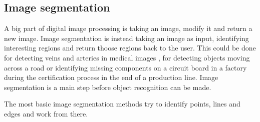 \subsection{Image segmentation}
A big part of digital image processing is taking an image, modify it and
return a new image. Image segmentation is instead taking an image as input,
identifying interesting regions and return thoose regions back to the user.
This could be done for detecting veins and arteries in medical images \cite{olena2010},
for detecting objects moving across a road or identifying missing components on
a circuit board in a factory during the certification process in the end of a production line.
Image segmentation is a main step before object recognition can be made.

The most basic image segmentation methods try to identify points, lines and edges
and work from there.

